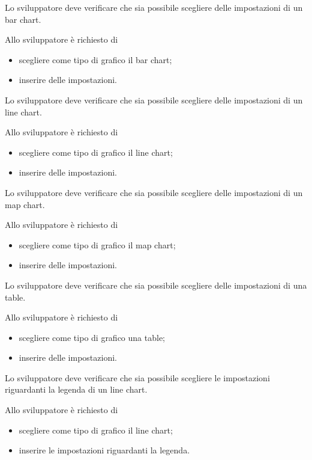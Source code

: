 	Lo sviluppatore deve verificare che sia possibile scegliere delle impostazioni di un bar chart.

		Allo sviluppatore è richiesto di
		\begin{itemize}
			\item scegliere come tipo di grafico il bar chart;
			\item inserire delle impostazioni.
		\end{itemize}

	Lo sviluppatore deve verificare che sia possibile scegliere delle impostazioni di un line chart.

		Allo sviluppatore è richiesto di
		\begin{itemize}
			\item scegliere come tipo di grafico il line chart;
			\item inserire delle impostazioni.
		\end{itemize}

	Lo sviluppatore deve verificare che sia possibile scegliere delle impostazioni di un map chart.

		Allo sviluppatore è richiesto di
		\begin{itemize}
			\item scegliere come tipo di grafico il map chart;
			\item inserire delle impostazioni.
		\end{itemize}

	Lo sviluppatore deve verificare che sia possibile scegliere delle impostazioni di una table.

		Allo sviluppatore è richiesto di
		\begin{itemize}
			\item scegliere come tipo di grafico una table;
			\item inserire delle impostazioni.
		\end{itemize}

	Lo sviluppatore deve verificare che sia possibile scegliere le impostazioni riguardanti la legenda di un line chart.

		Allo sviluppatore è richiesto di
		\begin{itemize}
			\item scegliere come tipo di grafico il line chart;
			\item inserire le impostazioni riguardanti la legenda.
		\end{itemize}

